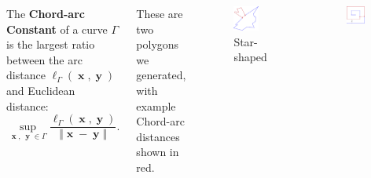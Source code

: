 \documentclass{beamer}
\DeclareMathOperator*{\xx}{\mathbf{x}}
\DeclareMathOperator*{\yy}{\mathbf{y}}
\begin{document}
\begin{frame}
\begin{columns}[t]
        \vspace{2cm}
        
        The \textbf{Chord-arc Constant} of a curve $\Gamma$ is the largest ratio between the arc distance $\ell_\Gamma(\xx,\yy)$ and Euclidean distance:
        $$\sup_{\xx,\, \yy \in \Gamma} \frac{\ell_\Gamma(\xx, \yy)}{\Vert \xx-\yy \Vert}\text{.}$$
        
        \vspace{1cm}
        
        These are two polygons we generated, with example Chord-arc distances shown in red.
        \vspace{2cm}
        \begin{columns}
            \renewcommand{\thefigure}{1a}
            \begin{figure}
                \centering
                \includegraphics[width=0.75\textwidth]{figures/CA_def.png}
                \caption{Star-shaped}
                \label{fig:ca_def}
            \end{figure}
            \renewcommand{\thefigure}{1b}
            \begin{figure}
                \centering
                \includegraphics[width=0.75\textwidth]{figures/spiral.png}

\end{figure}
\end{columns}
\end{columns}
\end{frame}
\end{document}
